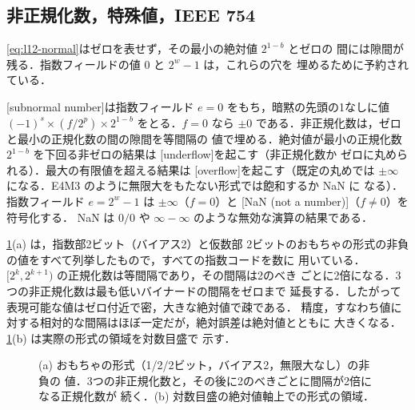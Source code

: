 \documentclass[../main.tex]{subfiles}
\begin{document}
\subsection{非正規化数，特殊値，IEEE 754}

\cref{eq:l12-normal}はゼロを表せず，その最小の絶対値 $2^{1-b}$ とゼロの
間には隙間が残る．指数フィールドの値 $0$ と $2^w - 1$ は，これらの穴を
埋めるために予約されている．

\begin{definition}
  [subnormal number]は指数フィールド
  $e = 0$ をもち，暗黙の先頭の1なしに値
  $(-1)^{s} \times (f / 2^{p}) \times 2^{1 - b}$ をとる．$f = 0$ なら
  $\pm 0$ である．非正規化数は，ゼロと最小の正規化数の間の隙間を等間隔の
  値で埋める．絶対値が最小の正規化数 $2^{1-b}$ を下回る非ゼロの結果は
  [underflow]を起こす（非正規化数か
  ゼロに丸められる）．最大の有限値を超える結果は
  [overflow]を起こす（既定の丸めでは
  $\pm\infty$ になる．E4M3 のように無限大をもたない形式では飽和するか NaN に
  なる）．指数フィールド $e = 2^w - 1$ は $\pm\infty$（$f = 0$）と
  [NaN (not a number)]（$f \ne 0$）を符号化する．
  NaN は $0/0$ や $\infty - \infty$ のような無効な演算の結果である．
\end{definition}

\cref{fig:l12-number-line}(a) は，指数部2ビット（バイアス2）と仮数部
2ビットのおもちゃの形式の非負の値をすべて列挙したもので，すべての指数コードを数に
用いている．$[2^{k}, 2^{k+1})$ の正規化数は等間隔であり，その間隔は2のべき
ごとに2倍になる．3つの非正規化数は最も低いバイナードの間隔をゼロまで
延長する．したがって表現可能な値はゼロ付近で密，大きな絶対値で疎である．
精度，すなわち値に対する相対的な間隔はほぼ一定だが，絶対誤差は絶対値とともに
大きくなる．\cref{fig:l12-number-line}(b) は実際の形式の領域を対数目盛で
示す．

\begin{figure}[tb]
  \centering
  
  \caption{(a) おもちゃの形式（1/2/2ビット，バイアス2，無限大なし）の非負の
    値．3つの非正規化数と，その後に2のべきごとに間隔が2倍になる正規化数が
    続く．(b) 対数目盛の絶対値軸上での形式の領域．}
  \label{fig:l12-number-line}
\end{figure}
\end{document}
